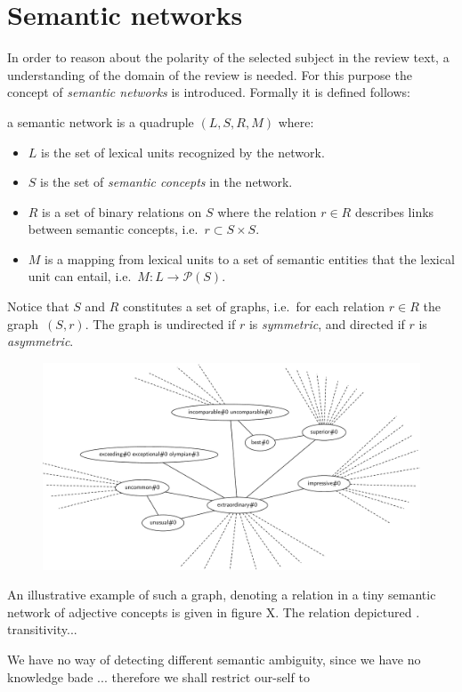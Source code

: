 
\chapter{Semantic networks}
\label{chap:SemanticNetworks}

In order to reason about the polarity of the selected subject in the review text, a understanding of the domain of the review is needed.  For this purpose the concept of \emph{semantic networks} is introduced. Formally it is defined follows:
\begin{definition}
a semantic network is a quadruple $(L,S,R,M)$ where:\\[-2em]
  \begin{itemize} %
    \item $L$ is the set of lexical units recognized by the network.
    \item $S$ is the set of \emph{semantic concepts} in the network.
    \item $R$ is a set of binary relations on $S$ where the relation $r \in R$ describes links\\ between semantic concepts, i.e.\ $r \subset S \times S$. 
    \item $M$ is a mapping from lexical units to a set of semantic entities that the lexical\\ unit can entail, i.e.\ $M: L \to \mathcal{P}(S)$.
  \end{itemize}
  \label{def:SemanticNetwork}
\end{definition}

Notice that $S$ and $R$ constitutes a set of graphs, i.e.\ for each relation $r \in R$ the graph~$(S,r)$. The graph is undirected if $r$ is \emph{symmetric}, and directed if $r$ is \emph{asymmetric}.

\begin{figure}[ht]
  \center
  \includegraphics[scale=.4]{Figures/Exceptional}
\end{figure}

\cite[p. 453-456, 468, 471]{ai}

An illustrative example of such a graph, denoting a relation in a tiny semantic network of adjective concepts is given in figure X. The relation depictured . 
transitivity...


We have no way of detecting different semantic ambiguity, since we have no knowledge bade ... therefore we shall restrict our-self to 